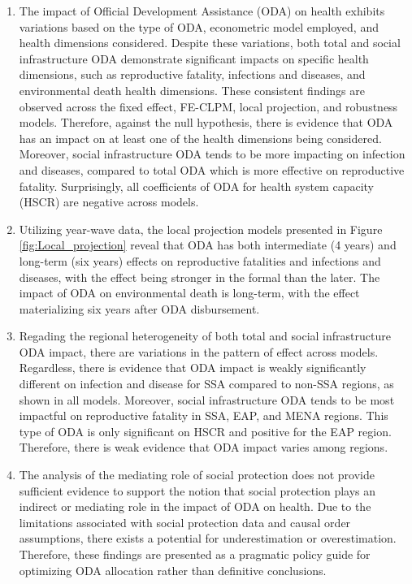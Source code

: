 \begin{enumerate}[i]
    \item The impact of Official Development Assistance (ODA) on health exhibits variations based on the type of ODA, econometric model employed, and health dimensions considered. Despite these variations, both total and social infrastructure ODA demonstrate significant impacts on specific health dimensions, such as reproductive fatality, infections and diseases, and environmental death health dimensions. These consistent findings are observed across the fixed effect, FE-CLPM, local projection, and robustness models. Therefore, against the null hypothesis, there is evidence that ODA has an impact on at least one of the health dimensions being considered. Moreover, social infrastructure ODA tends to be more impacting on infection and diseases, compared to total ODA which is more effective on reproductive fatality.
    Surprisingly, all coefficients of ODA for health system capacity (HSCR) are negative across models.

    \item Utilizing year-wave data, the local projection models presented in Figure \ref{fig:Local_projection} reveal that ODA has both intermediate (4 years) and long-term (six years) effects on reproductive fatalities and infections and diseases, with the effect being stronger in the formal than the later. The impact of ODA on environmental death is long-term, with the effect materializing six years after ODA disbursement. 

    \item Regading the regional heterogeneity of both total and social infrastructure ODA impact, there are variations in the pattern of effect across models. Regardless, there is evidence that ODA impact is weakly significantly different on infection and disease for SSA compared to non-SSA regions, as shown in all models. Moreover, social infrastructure ODA tends to be most impactful on reproductive fatality in SSA, EAP, and MENA regions. This type of ODA is only significant on HSCR and positive for the EAP region. Therefore, there is weak evidence that ODA impact varies among regions. 
    

    \item The analysis of the mediating role of social protection does not provide sufficient evidence to support the notion that social protection plays an indirect or mediating role in the impact of ODA on health. Due to the limitations associated with social protection data and causal order assumptions, there exists a potential for underestimation or overestimation. Therefore, these findings are presented as a pragmatic policy guide for optimizing ODA allocation rather than definitive conclusions.
\end{enumerate}